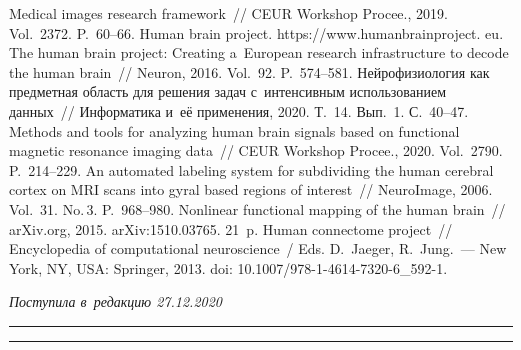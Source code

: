\begin{multicols}{2}
{{\begin{thebibliography}{99}
   Medical images research framework~// CEUR 
Workshop Procee., 2019. Vol.~2372. P.~60--66. 
  Human brain project. {\sf https://www.humanbrainproject. eu}.
   The human brain 
project: Creating a~European research infrastructure to decode the human brain~// Neuron, 
2016. Vol.~92. P.~574--581.
Нейрофизиология как предметная область для решения задач с~интенсивным 
использованием данных~// Информатика и~её применения, 2020. Т.~14. Вып.~1. С.~40--47.
   Methods and tools for 
analyzing human brain signals based on functional magnetic resonance imaging data~// CEUR 
Workshop Procee., 2020. Vol.~2790. P.~214--229.
   An automated labeling system for 
subdividing the human cerebral cortex on MRI scans into gyral based regions of interest~// 
NeuroImage, 2006. Vol.~31. No.\,3. P.~968--980.
   Nonlinear functional mapping 
of the human brain~// arXiv.org, 2015. arXiv:1510.03765. 21~p.
   Human connectome project~// Encyclopedia of 
computational neuroscience~/ Eds. D.~Jaeger, R.~Jung.~--- New York, NY, USA: Springer, 
2013. doi: 10.1007/978-1-4614-7320-6\_592-1.
\end{thebibliography}

}
}

\end{multicols}

\vspace*{-6pt}

\hfill{\small\textit{Поступила в~редакцию 27.12.2020}}

\vspace*{8pt}




\hrule

\vspace*{2pt}

\hrule


